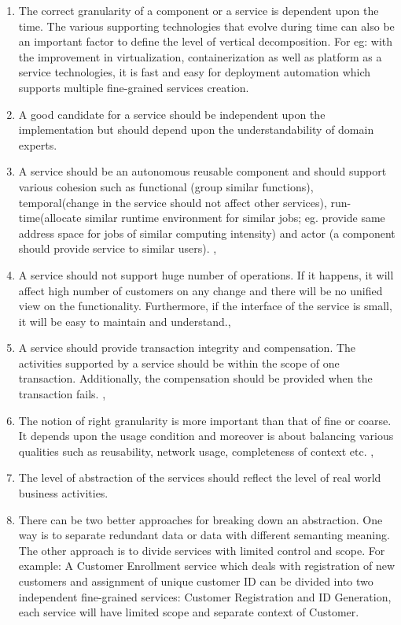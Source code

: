 \begin{enumerate}
\item The correct granularity of a component or a service is dependent upon the time. The various supporting technologies that evolve during time can also be an important factor to define the level of vertical decomposition. For eg: with the improvement in virtualization, containerization as well as platform as a service technologies, it is fast and easy for deployment automation which supports multiple fine-grained services creation.\cite{Peter-Herzum:2000aa}
\item A good candidate for a service should be independent upon the implementation but should depend upon the understandability of domain experts.
\cite{Raf-Haesen:2015aa, Peter-Herzum:2000aa}
\item A service should be an autonomous reusable component and should support various cohesion such as functional (group similar functions), temporal(change in the service should not affect other services), run-time(allocate similar runtime environment for similar jobs; eg. provide same address space for jobs of similar computing intensity) and actor (a component should provide service to similar users).
\cite{Raf-Haesen:2015aa}, \cite{Peter-Herzum:2000aa}
\item A service should not support huge number of operations. If it happens, it will affect high number of customers on any change and there will be no unified view on the functionality. Furthermore, if the interface of the service is small, it will be easy to maintain and understand.\cite{Raf-Haesen:2015aa}, \cite{Pierre-Reldin:2007aa}
\item A service should provide transaction integrity and compensation. The activities supported by a service should be within the scope of one transaction. Additionally, the compensation should be provided when the transaction fails. \cite{Raf-Haesen:2015aa}, \cite{Foody:2005aa}
\item The notion of right granularity is more important than that of fine or coarse. It depends upon the usage condition and moreover is about balancing various qualities such as reusability, network usage, completeness of context etc. \cite{Raf-Haesen:2015aa}, \cite{Lawrence-Wilkes:2004aa}
\item The level of abstraction of the services should reflect the level of real world business activities. \cite{Pierre-Reldin:2007aa}
\item There can be two better approaches for breaking down an abstraction. One way is to separate redundant data or data with different semanting meaning. The other approach is to divide services with limited control and scope. For example: A Customer Enrollment service which deals with registration of new customers and assignment of unique customer ID can be divided into two independent fine-grained services: Customer Registration and ID Generation, each service will have limited scope and separate context of Customer.\cite{Pierre-Reldin:2007aa}
\end{enumerate}

